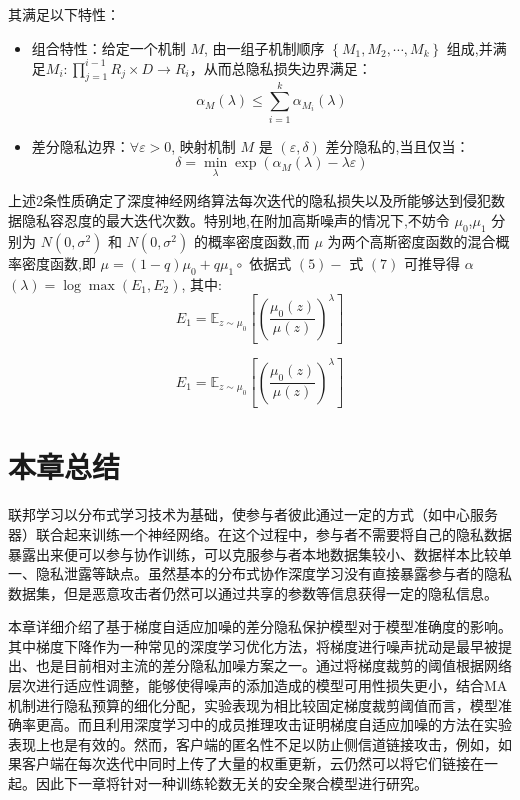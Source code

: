 其满足以下特性：

\begin{itemize}
\item 组合特性：给定一个机制 $M$, 由一组子机制顺序 $\left\{M_{1}, M_{2}, \cdots, M_{k}\right\}$ 组成,并满足$M_{i}: \prod_{j=1}^{i-1} R_{j} \times D \rightarrow R_{i}$，从而总隐私损失边界满足：
\begin{equation}\label{eq:损失边界值定义2}
\alpha_{M}(\lambda) \leqslant \sum_{i=1}^{k} \alpha_{M_{i}}(\lambda)
\end{equation}

\item 差分隐私边界：$\forall \varepsilon>0$, 映射机制 $M$ 是 $(\varepsilon, \delta)$ 差分隐私的,当且仅当：
\begin{equation}\label{eq:损失边界值定义2}
\delta=\min _{\lambda} \exp \left(\alpha_{M}(\lambda)-\lambda \varepsilon\right)
\end{equation}
\end{itemize}

上述2条性质确定了深度神经网络算法每次迭代的隐私损失以及所能够达到侵犯数据隐私容忍度的最大迭代次数。特别地,在附加高斯噪声的情况下,不妨令 $\mu_{0}$,$\mu_{1}$ 分别为 $N\left(0, \sigma^{2}\right)$ 和 $N\left(0, \sigma^{2}\right)$ 的概率密度函数,而 $\mu$ 为两个高斯密度函数的混合概率密度函数,即 $\mu=(1-q) \mu_{0}+q \mu_{1} \circ$ 依据式 $(5)-$ 式 $(7)$ 可推导得 $\alpha$ $(\lambda)=\log \max \left(E_{1}, E_{2}\right)$, 其中:
\begin{equation}\label{eq:隐私容忍1}
E_{1}=\mathbb{E}_{z \sim \mu_{0}}\left[\left(\frac{\mu_{0}(z)}{\mu(z)}\right)^{\lambda}\right]
\end{equation}

\begin{equation}\label{eq:隐私容忍2}
E_{1}=\mathbb{E}_{z \sim \mu_{0}}\left[\left(\frac{\mu_{0}(z)}{\mu(z)}\right)^{\lambda}\right]
\end{equation}

\section{本章总结}
联邦学习以分布式学习技术为基础，使参与者彼此通过一定的方式（如中心服务器）联合起来训练一个神经网络。在这个过程中，参与者不需要将自己的隐私数据暴露出来便可以参与协作训练，可以克服参与者本地数据集较小、数据样本比较单一、隐私泄露等缺点。虽然基本的分布式协作深度学习没有直接暴露参与者的隐私数据集，但是恶意攻击者仍然可以通过共享的参数等信息获得一定的隐私信息。 

本章详细介绍了基于梯度自适应加噪的差分隐私保护模型对于模型准确度的影响。其中梯度下降作为一种常见的深度学习优化方法，将梯度进行噪声扰动是最早被提出、也是目前相对主流的差分隐私加噪方案之一。通过将梯度裁剪的阈值根据网络层次进行适应性调整，能够使得噪声的添加造成的模型可用性损失更小，结合MA机制进行隐私预算的细化分配，实验表现为相比较固定梯度裁剪阈值而言，模型准确率更高。而且利用深度学习中的成员推理攻击证明梯度自适应加噪的方法在实验表现上也是有效的。然而，客户端的匿名性不足以防止侧信道链接攻击，例如，如果客户端在每次迭代中同时上传了大量的权重更新，云仍然可以将它们链接在一起。因此下一章将针对一种训练轮数无关的安全聚合模型进行研究。

